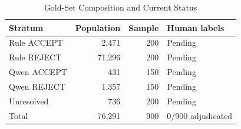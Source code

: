 \begin{table}[t]
\caption{Gold-Set Composition and Current Status}
\label{tab:gold-set}
\centering
\begin{tabular}{lrrl}
\hline
Stratum & Population & Sample & Human labels \\
\hline
Rule ACCEPT & 2,471 & 200 & Pending \\
Rule REJECT & 71,296 & 200 & Pending \\
Qwen ACCEPT & 431 & 150 & Pending \\
Qwen REJECT & 1,357 & 150 & Pending \\
Unresolved & 736 & 200 & Pending \\
\hline
Total & 76,291 & 900 & 0/900 adjudicated \\
\hline
\end{tabular}
\end{table}

